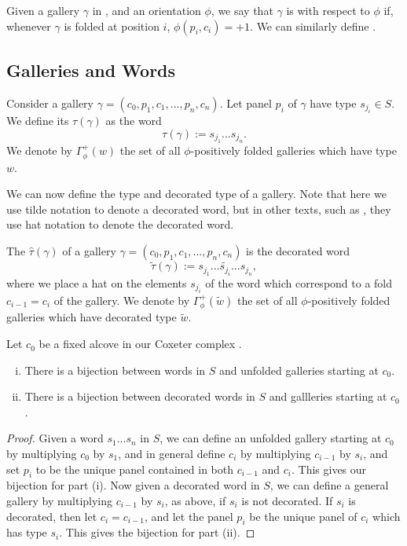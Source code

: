 \documentclass[11pt]{article}
\begin{document}
\begin{definition}
    Given a gallery $\gamma$ in \sg, and an orientation $\phi$, we say that $\gamma$ is  with respect to $\phi$ if, whenever $\gamma$ is folded at position $i$, $\phi(p_i,c_i)=+1$.  We can similarly define .
\end{definition}


\subsection{Galleries and Words}

\begin{definition}
    Consider a gallery $\gamma = (c_0,p_1,c_1,...,p_n,c_n)$. Let panel $p_i$ of $\gamma$ have type $s_{j_i}\in S$. We define its  $\tau(\gamma)$ as the word 
    \[\tau(\gamma):=s_{j_1}...s_{j_n}.\]
    We denote by $\Gamma_{\phi}^+(w)$ the set of all $\phi$-positively folded galleries which have type $w$. 
\end{definition}

We can now define the type and decorated type of a gallery. Note that here we use tilde notation to denote a decorated word, but in other texts, such as \cite{SHA}, they use hat notation to denote the decorated word.
\begin{definition}
    The  $\hat\tau(\gamma)$ of a gallery $\gamma = (c_0,p_1,c_1,...,p_n,c_n)$ is the decorated word
    \[\tilde\tau(\gamma):= s_{j_1}...\tilde{s_{j_i}}...s_{j_n},\]
    where we place a hat on the elements $s_{j_i}$ of the word which correspond to a fold $c_{i-1}=c_i$ of the gallery. We denote by $\Gamma_{\phi}^+(\tilde{w})$ the set of all $\phi$-positively folded galleries which have decorated type $\tilde{w}$.
\end{definition}


\begin{lemma}\cite[p.128]{SHA}
    Let $c_0$ be a fixed alcove in our Coxeter complex \sg. 
    \begin{enumerate}[(i)]
        \item There is a bijection between words in $S$ and unfolded galleries starting at $c_0$.
        \item There is a bijection between decorated words in $S$ and gallleries starting at $c_0$. 
    \end{enumerate}
\end{lemma}

\begin{proof}
    Given a word $s_1...s_n$ in $S$, we can define an unfolded gallery starting at $c_0$ by multiplying $c_0$ by $s_1$, and in general define $c_i$ by multiplying $c_{i-1}$ by $s_{i}$, and set $p_i$ to be the unique panel contained in both $c_{i-1}$ and $c_i$. This gives our bijection for part (i). 
    Now given a decorated word in $S$, we can define a general gallery by multiplying $c_{i-1}$ by $s_{i}$, as above, if $s_{i}$ is not decorated. If $s_{i}$ is decorated, then let $c_i=c_{i-1}$, and let the panel $p_i$ be the unique panel of $c_i$ which has type $s_i$. This gives the bijection for part (ii). 
\end{proof}
\end{document}
